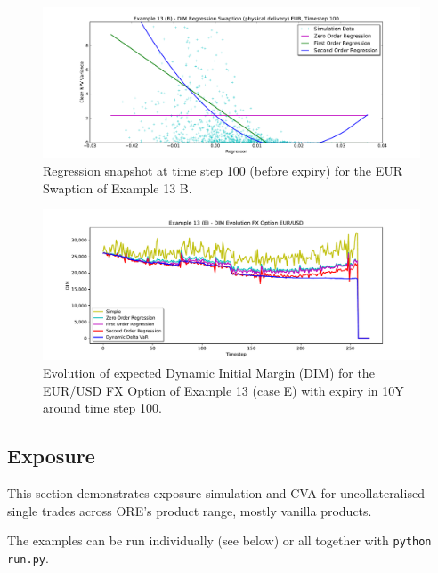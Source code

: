 \begin{figure}[h!]
\begin{center}
\includegraphics[scale=0.45]{examples/mpl_dim_regression_B_swaption_eur_t100.pdf}
\end{center}
\caption{Regression snapshot at time step 100 (before expiry) for the EUR Swaption of Example 13 B.}
\label{fig_ex13b_regression}
\end{figure}

\begin{figure}[h!]
\begin{center}
\includegraphics[scale=0.45]{examples/mpl_dim_evolution_E_fxopt.pdf}
\end{center}
\caption{Evolution of expected Dynamic Initial Margin (DIM) for the EUR/USD FX Option of Example 13 (case E) with expiry in 10Y
  around time step 100.}
\label{fig_ex13c_evolution}
\end{figure}

\subsection{Exposure}\label{example:exposure}

This section demonstrates exposure simulation and CVA for uncollateralised single trades across ORE's product range, mostly vanilla products.

The examples can be run individually (see below) or all together with {\tt python run.py}.

